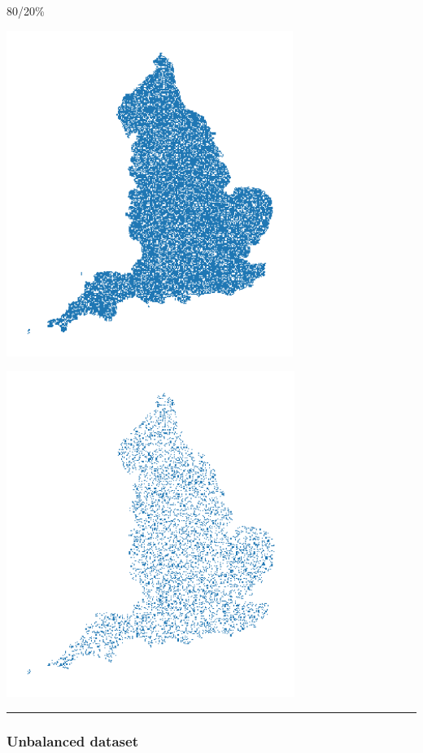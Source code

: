\documentclass[
  letterpaper,
  DIV=11,
  numbers=noendperiod]{scrartcl}
\begin{document}
80/20\% \begin{center}
\includegraphics[width=\textwidth,height=4.16667in]{../figures/algo_design/train_df.png}
\end{center}
\begin{center}
\includegraphics[width=\textwidth,height=4.16667in]{../figures/algo_design/test_df.png}
\end{center}

\begin{center}\rule{0.5\linewidth}{0.5pt}\end{center}

\subsubsection{Unbalanced dataset}\label{unbalanced-dataset}
\end{document}
